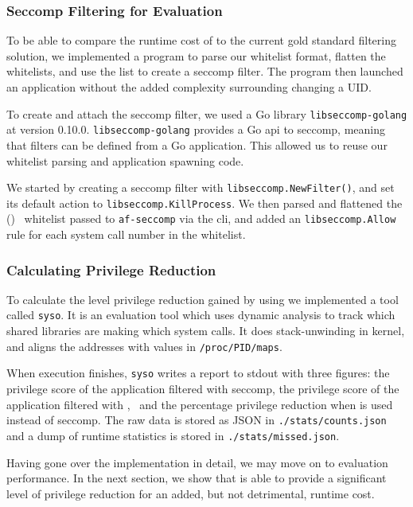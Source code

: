 \subsubsection{Seccomp Filtering for Evaluation}\label{subsubsec:syso-impl}

To be able to compare the runtime cost of \af to the current gold standard
filtering solution, we implemented a program to parse our whitelist format,
flatten the whitelists, and use the list to create a seccomp filter. The program
then launched an application without the added complexity surrounding changing
a UID.

To create and attach the seccomp filter, we used a Go library 
\texttt{libseccomp-golang} at version 0.10.0. \texttt{libseccomp-golang}
provides a Go \ac{api} to seccomp, meaning that filters can be defined from a
Go application. This allowed us to reuse our whitelist parsing and application
spawning code.

We started by creating a seccomp filter with \texttt{libseccomp.NewFilter()}, 
and set its default action to \texttt{libseccomp.KillProcess}. We then parsed
and flattened the (\afss)~ whitelist passed to \texttt{af-seccomp} via the
\ac{cli}, and added an \texttt{libseccomp.Allow} rule for each system call number in
the whitelist.

\subsubsection{Calculating Privilege Reduction}

To calculate the level privilege reduction gained by using \af we implemented a
tool called \texttt{syso}. It is an evaluation tool which uses dynamic analysis
to track which shared libraries are making which system calls. It does
stack-unwinding in kernel, and aligns the addresses with values in
\texttt{/proc/PID/maps}. 

When execution finishes, \texttt{syso} writes a report to \ac{stdout} with three
figures: the privilege score of the application filtered with seccomp, the
privilege score of the application filtered with \afss,~ and the percentage
privilege reduction when \af is used instead of seccomp. The raw data is stored
as JSON in \texttt{./stats/counts.json} and a dump of runtime statistics is
stored in \texttt{./stats/missed.json}.

Having gone over the implementation in detail, we may move on to evaluation
\afg performance. In the next section, we show that \af is able to provide a
significant level of privilege reduction for an added, but not detrimental,
runtime cost.
